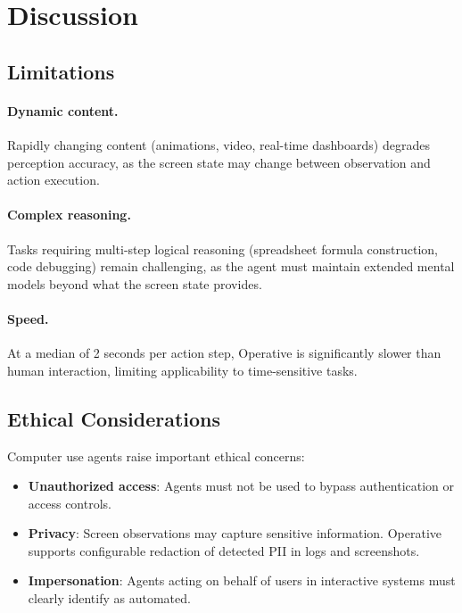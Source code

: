 \section{Discussion}

\label{sec:discussion}

\subsection{Limitations}

\paragraph{Dynamic content.} Rapidly changing content (animations, video, real-time dashboards) degrades perception accuracy, as the screen state may change between observation and action execution.

\paragraph{Complex reasoning.} Tasks requiring multi-step logical reasoning (spreadsheet formula construction, code debugging) remain challenging, as the agent must maintain extended mental models beyond what the screen state provides.

\paragraph{Speed.} At a median of 2 seconds per action step, Operative is significantly slower than human interaction, limiting applicability to time-sensitive tasks.

\subsection{Ethical Considerations}

Computer use agents raise important ethical concerns:

\begin{itemize}[leftmargin=*]
    \item \textbf{Unauthorized access}: Agents must not be used to bypass authentication or access controls.
    \item \textbf{Privacy}: Screen observations may capture sensitive information. Operative supports configurable redaction of detected PII in logs and screenshots.
    \item \textbf{Impersonation}: Agents acting on behalf of users in interactive systems must clearly identify as automated.
\end{itemize}

